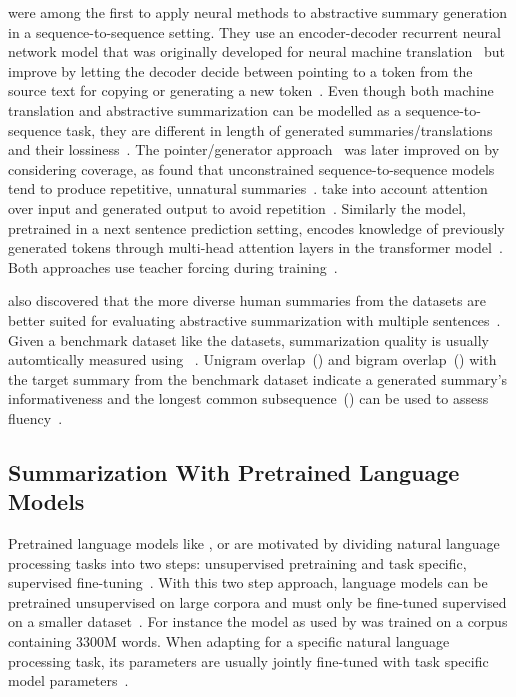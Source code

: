 \citeauthor{NallapatiZSGX2016} were among the first to apply neural methods to abstractive summary generation in a sequence-to-sequence setting. They use an encoder-decoder recurrent neural network model that was originally developed for neural machine translation~\cite{BahdanauCB2014} but improve by letting the decoder decide between pointing to a token from the source text for copying or generating a new token~\cite{NallapatiZSGX2016}.
Even though both machine translation and abstractive summarization can be modelled as a sequence-to-sequence task, they are different in length of generated summaries/translations and their lossiness~\cite{NallapatiZSGX2016}.
The pointer/generator approach~\cite{NallapatiZSGX2016} was later improved on by considering coverage, as \citeauthor{SeeLM2017} found that unconstrained sequence-to-sequence models tend to produce repetitive, unnatural summaries~\cite{SeeLM2017,PaulusXS2018}.
\citeauthor{PaulusXS2018} take into account attention over input and generated output to avoid repetition~\cite{PaulusXS2018}.
Similarly the \Bert model, pretrained in a next sentence prediction setting, encodes knowledge of previously generated tokens through multi-head attention layers in the transformer model~\cite{DevlinCLT2019,VaswaniSPUJGKP2017}.
Both approaches use teacher forcing during training~\cite{PaulusXS2018,DevlinCLT2019}.

\citeauthor{NallapatiZSGX2016} also discovered that the more diverse human summaries from the \CnnDailyMail datasets are better suited for evaluating abstractive summarization with multiple sentences~\cite{NallapatiZSGX2016,HermannKGEKSB2015}.
Given a benchmark dataset like the \CnnDailyMail datasets, summarization quality is usually automtically measured using \Rouge~\cite{Lin2004}.
Unigram overlap~() and bigram overlap~() with the target summary from the benchmark dataset indicate a generated summary's informativeness and the longest common subsequence~(\RougeL) can be used to assess fluency~\cite{LiuL2019,Lin2004}.

\subsection{Summarization With Pretrained Language Models}

Pretrained language models like \Elmo, \Gpt or \Bert are motivated by dividing natural language processing tasks into two steps: unsupervised pretraining and task specific, supervised fine-tuning~\cite{PetersNIGCLZ2018,RadfordNSS2018,DevlinCLT2019}.
With this two step approach, language models can be pretrained unsupervised on large corpora and must only be fine-tuned supervised on a smaller dataset~\cite{DevlinCLT2019}.
For instance the \BertBase model as used by \citeauthor{LiuL2019} was trained on a corpus containing 3300M words.
When adapting \Bert for a specific natural language processing task, its parameters are usually jointly fine-tuned with task specific model parameters~\cite{DevlinCLT2019,LiuL2019}.

